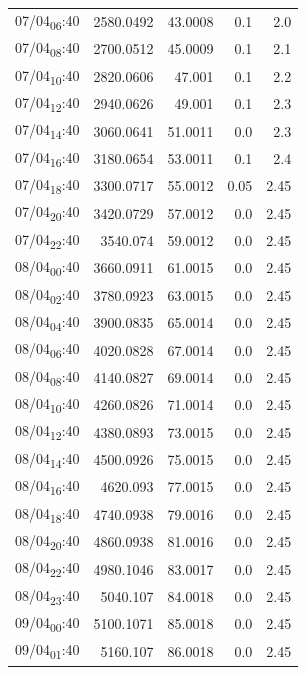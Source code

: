 \documentclass[11pt]{article}
\begin{document}
\begin{center}
\begin{tabular}{lrrrr}
07/04\textsubscript{06}:40 & 2580.0492 & 43.0008 & 0.1 & 2.0\\[0pt]
07/04\textsubscript{08}:40 & 2700.0512 & 45.0009 & 0.1 & 2.1\\[0pt]
07/04\textsubscript{10}:40 & 2820.0606 & 47.001 & 0.1 & 2.2\\[0pt]
07/04\textsubscript{12}:40 & 2940.0626 & 49.001 & 0.1 & 2.3\\[0pt]
07/04\textsubscript{14}:40 & 3060.0641 & 51.0011 & 0.0 & 2.3\\[0pt]
07/04\textsubscript{16}:40 & 3180.0654 & 53.0011 & 0.1 & 2.4\\[0pt]
07/04\textsubscript{18}:40 & 3300.0717 & 55.0012 & 0.05 & 2.45\\[0pt]
07/04\textsubscript{20}:40 & 3420.0729 & 57.0012 & 0.0 & 2.45\\[0pt]
07/04\textsubscript{22}:40 & 3540.074 & 59.0012 & 0.0 & 2.45\\[0pt]
08/04\textsubscript{00}:40 & 3660.0911 & 61.0015 & 0.0 & 2.45\\[0pt]
08/04\textsubscript{02}:40 & 3780.0923 & 63.0015 & 0.0 & 2.45\\[0pt]
08/04\textsubscript{04}:40 & 3900.0835 & 65.0014 & 0.0 & 2.45\\[0pt]
08/04\textsubscript{06}:40 & 4020.0828 & 67.0014 & 0.0 & 2.45\\[0pt]
08/04\textsubscript{08}:40 & 4140.0827 & 69.0014 & 0.0 & 2.45\\[0pt]
08/04\textsubscript{10}:40 & 4260.0826 & 71.0014 & 0.0 & 2.45\\[0pt]
08/04\textsubscript{12}:40 & 4380.0893 & 73.0015 & 0.0 & 2.45\\[0pt]
08/04\textsubscript{14}:40 & 4500.0926 & 75.0015 & 0.0 & 2.45\\[0pt]
08/04\textsubscript{16}:40 & 4620.093 & 77.0015 & 0.0 & 2.45\\[0pt]
08/04\textsubscript{18}:40 & 4740.0938 & 79.0016 & 0.0 & 2.45\\[0pt]
08/04\textsubscript{20}:40 & 4860.0938 & 81.0016 & 0.0 & 2.45\\[0pt]
08/04\textsubscript{22}:40 & 4980.1046 & 83.0017 & 0.0 & 2.45\\[0pt]
08/04\textsubscript{23}:40 & 5040.107 & 84.0018 & 0.0 & 2.45\\[0pt]
09/04\textsubscript{00}:40 & 5100.1071 & 85.0018 & 0.0 & 2.45\\[0pt]
09/04\textsubscript{01}:40 & 5160.107 & 86.0018 & 0.0 & 2.45\\[0pt]

\end{tabular}
\end{center}
\end{document}
